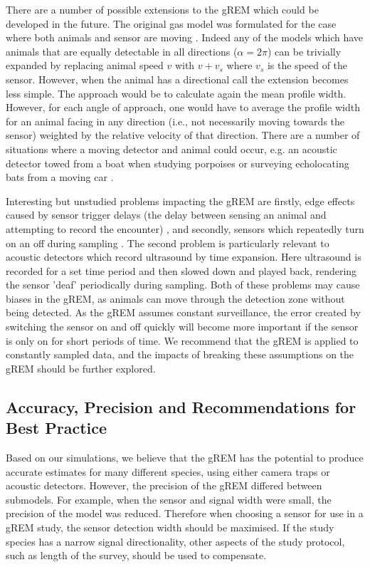 There are a number of possible extensions to the gREM which could be developed in the future.
The original gas model was formulated for the case where both animals and sensor are moving \cite{Hutchinson_Waser_2007}.
Indeed any of the models which have animals that are equally detectable in all directions ($\alpha = 2\pi$) can be trivially expanded by replacing animal speed $v$ with $v + v_s$ where $v_s$ is the speed of the sensor.
However, when the animal has a directional call the extension becomes less simple.
The approach would be to calculate again the mean profile width.
However, for each angle of approach, one would have to average the profile width for an animal facing in any direction (i.e., not necessarily moving towards the sensor) weighted by the relative velocity of that direction.
There are a number of situations where a moving detector and animal could occur, e.g.
an acoustic detector towed from a boat when studying porpoises \cite{kimura2014acoustic} or surveying echolocating bats from a moving car \cite{jones2011indicator}. 

Interesting but unstudied problems impacting the gREM are firstly, edge effects caused by sensor trigger delays (the delay between sensing an animal and attempting to record the encounter) \cite{rovero2013camera}, and secondly, sensors which repeatedly turn on an off during sampling \cite{jones2011indicator}.
The second problem is particularly relevant to acoustic detectors which record ultrasound by time expansion.
Here ultrasound is recorded for a set time period and then slowed down and played back, rendering the sensor 'deaf' periodically during sampling.
Both of these problems may cause biases in the gREM, as animals can move through the detection zone without being detected.
As the gREM assumes constant surveillance, the error created by switching the sensor on and off quickly will become more important if the sensor is only on for short periods of time.
We recommend that the gREM is applied to constantly sampled data, and the impacts of breaking these assumptions on the gREM should be further explored. 

\subsection{Accuracy, Precision and Recommendations for Best Practice}
Based on our simulations, we believe that the gREM has the potential to produce accurate estimates for many different species, using either camera traps or acoustic detectors.
However, the precision of the gREM differed between submodels.
For example, when the sensor and signal width were small, the precision of the model was reduced.
Therefore when choosing a sensor for use in a gREM study, the sensor detection width should be maximised.
If the study species has a narrow signal directionality, other aspects of the study protocol, such as length of the survey, should be used to compensate. 

